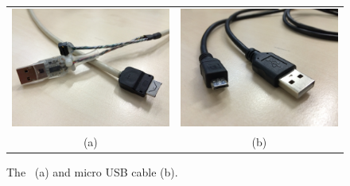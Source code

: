 \begin{figure}[htb]
\begin{center}
\begin{tabular}{cc}
\includegraphics[scale=0.05]{Bilder/ProgCable.JPG} &
\includegraphics[scale=0.05]{Bilder/USBCable.JPG} \\
(a) & (b) \\
\end{tabular}
\caption{The \progcable\ (a) and micro USB cable (b).}
\label{fig:cables}
\end{center}
\end{figure}

